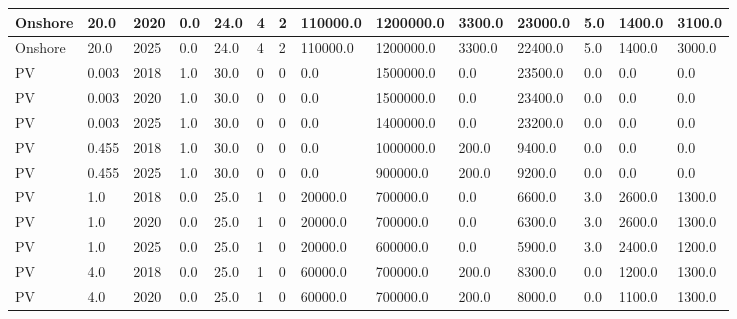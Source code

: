 \documentclass[sigconf]{acmart}
\begin{document}
\begin{table*}[]
\begin{tabularx}{\linewidth}{|p{}|l|l|l|l|l|l|l|l|l|l|l|l|l|}
Onshore                       & 20.0        & 2020             & 0.0    & 24.0 & 4     & 2     & 110000.0 & 1200000.0 & 3300.0   & 23000.0 & 5.0   & 1400.0  & 3100.0   \\ \hline
Onshore                       & 20.0        & 2025             & 0.0    & 24.0 & 4     & 2     & 110000.0 & 1200000.0 & 3300.0   & 22400.0 & 5.0   & 1400.0  & 3000.0   \\ \hline
PV                            & 0.003       & 2018             & 1.0    & 30.0 & 0     & 0     & 0.0      & 1500000.0 & 0.0      & 23500.0 & 0.0   & 0.0     & 0.0      \\ \hline
PV                            & 0.003       & 2020             & 1.0    & 30.0 & 0     & 0     & 0.0      & 1500000.0 & 0.0      & 23400.0 & 0.0   & 0.0     & 0.0      \\ \hline
PV                            & 0.003       & 2025             & 1.0    & 30.0 & 0     & 0     & 0.0      & 1400000.0 & 0.0      & 23200.0 & 0.0   & 0.0     & 0.0      \\ \hline
PV                            & 0.455       & 2018             & 1.0    & 30.0 & 0     & 0     & 0.0      & 1000000.0 & 200.0    & 9400.0  & 0.0   & 0.0     & 0.0      \\ \hline
PV                            & 0.455       & 2025             & 1.0    & 30.0 & 0     & 0     & 0.0      & 900000.0  & 200.0    & 9200.0  & 0.0   & 0.0     & 0.0      \\ \hline
PV                            & 1.0         & 2018             & 0.0    & 25.0 & 1     & 0     & 20000.0  & 700000.0  & 0.0      & 6600.0  & 3.0   & 2600.0  & 1300.0   \\ \hline
PV                            & 1.0         & 2020             & 0.0    & 25.0 & 1     & 0     & 20000.0  & 700000.0  & 0.0      & 6300.0  & 3.0   & 2600.0  & 1300.0   \\ \hline
PV                            & 1.0         & 2025             & 0.0    & 25.0 & 1     & 0     & 20000.0  & 600000.0  & 0.0      & 5900.0  & 3.0   & 2400.0  & 1200.0   \\ \hline
PV                            & 4.0         & 2018             & 0.0    & 25.0 & 1     & 0     & 60000.0  & 700000.0  & 200.0    & 8300.0  & 0.0   & 1200.0  & 1300.0   \\ \hline
PV                            & 4.0         & 2020             & 0.0    & 25.0 & 1     & 0     & 60000.0  & 700000.0  & 200.0    & 8000.0  & 0.0   & 1100.0  & 1300.0   \\ \hline

\end{tabularx}
\end{table*}
\end{document}
